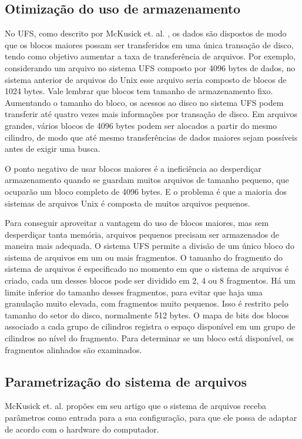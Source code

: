 \subsection{Otimização do uso de armazenamento}

No UFS, como descrito por McKusick et. al. \cite{mckusick1984fast}, os dados são dispostos de modo que os blocos maiores possam ser transferidos em uma única transação de disco, tendo como objetivo aumentar a taxa de transferência de arquivos. Por exemplo, considerando um arquivo no sistema UFS composto por 4096 bytes de dados, no sistema anterior de arquivos do Unix esse arquivo seria composto de blocos de 1024 bytes. Vale lembrar que blocos tem tamanho de armazenamento fixo. Aumentando o tamanho do bloco, os acessos ao disco no sistema UFS podem transferir até quatro vezes mais informações por transação de disco. Em arquivos grandes, vários blocos de 4096 bytes podem ser alocados a partir do mesmo cilindro, de modo que até mesmo transferências de dados maiores sejam possíveis antes de exigir uma busca. 

O ponto negativo de usar blocos maiores é a ineficiência ao desperdiçar armazenamento quando se guardam muitos arquivos de tamanho pequeno, que ocuparão um bloco completo de 4096 bytes. E o problema é que a maioria dos sistemas de arquivos Unix é composta de muitos arquivos pequenos.

Para conseguir aproveitar a vantagem do uso de blocos maiores, mas sem desperdiçar tanta memória, arquivos pequenos precisam ser armazenados de maneira mais adequada. O sistema UFS permite a divisão de um único bloco do sistema de arquivos em um ou mais fragmentos. O tamanho do fragmento do sistema de arquivos é especificado no momento em que o sistema de arquivos é criado, cada um desses blocos pode ser dividido em 2, 4 ou 8 fragmentos. Há um limite inferior do tamanho desses fragmentos, para evitar que haja uma granulação muito elevada, com fragmentos muito pequenos. Isso é restrito pelo tamanho do setor do disco, normalmente 512 bytes. O mapa de bits dos blocos associado a cada grupo de cilindros registra o espaço disponível em um grupo de cilindros no nível do fragmento. Para determinar se um bloco está disponível, os fragmentos alinhados são examinados.

\subsection{Parametrização do sistema de arquivos}

McKusick et. al. \cite{mckusick1984fast} propões em seu artigo que o sistema de arquivos receba parâmetros como entrada para a sua configuração, para que ele possa de adaptar de acordo com o hardware do computador.

